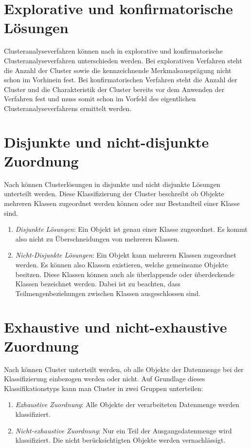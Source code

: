 \section{Explorative und konfirmatorische Lösungen}
Clusteranalyseverfahren können nach \citet[S. 22]{Bacher.2010} in explorative und konfirmatorische Clusteranalyseverfahren unterschieden werden. 
Bei explorativen Verfahren steht die Anzahl der Cluster sowie die kennzeichnende Merkmalsausprägung nicht schon im Vorhinein fest.
Bei konfirmatorischen Verfahren steht die Anzahl der Cluster und die Charakteristik der Cluster bereits vor dem Anwenden der Verfahren fest und muss somit schon im Vorfeld des eigentlichen Clusteranalyseverfahrens ermittelt werden.

\section{Disjunkte und nicht-disjunkte Zuordnung}
Nach \citet[S. 175]{Bankhofer.2008} können Clusterlösungen in disjunkte und nicht disjunkte Lösungen unterteilt werden. Diese Klassifizierung der Cluster beschreibt ob Objekte mehreren Klassen zugeordnet werden können oder nur Bestandteil einer Klasse sind.
\begin{enumerate}
    \item \textit{Disjunkte Lösungen}: Ein Objekt ist genau einer Klasse zugeordnet. Es kommt also nicht zu Überschneidungen von mehreren Klassen.
    \item \textit{Nicht-Disjunkte Lösungen}: Ein Objekt kann mehreren Klassen zugeordnet werden. Es können also Klassen existieren, welche gemeinsame Objekte besitzen. Diese Klassen können auch als überlappende oder überdeckende Klassen bezeichnet werden. Dabei ist zu beachten, dass Teilmengenbeziehungen zwischen Klassen ausgeschlossen sind.
\end{enumerate}

\section{Exhaustive und nicht-exhaustive Zuordnung}
Nach \citet[S. 174]{Bankhofer.2008} können Cluster unterteilt werden, ob alle Objekte der Datenmenge bei der Klassifizierung einbezogen werden oder nicht. Auf Grundlage dieses Klassifikationstyps kann man Cluster in zwei Gruppen unterteilen:
\begin{enumerate}
    \item \textit{Exhaustive Zuordnung}: Alle Objekte der verarbeiteten Datenmenge werden klassifiziert.
    \item \textit{Nicht-exhaustive Zuordnung}: Nur ein Teil der Ausgangsdatenmenge wird klassifiziert. Die nicht berücksichtigten Objekte werden vernachlässigt.
\end{enumerate}

